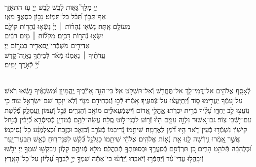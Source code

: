 \documentclass[twoside, openany, parskip=half, 11pt]{book}
\begin{document}
\\
\vspace{-1.5\baselineskip}
\begin{narrow}
יְיָ֣ מָלָךְ֮ גֵּא֢וּת לָ֫בֵ֥שׁ\hfill
לָבֵ֣שׁ יְיָ֭ עֹ֣ז הִתְאַזָּ֑ר\\ אַף־תִּכּ֥וֹן תֵּ֝בֵ֗ל בַּל־תִּמּֽוֹט׃ \hfill
נָכ֣וֹן כִּסְאֲךָ֣ מֵאָ֑ז\\ מֵעוֹלָ֣ם אָֽתָּה׃ \hfill
נָשְֿׂא֤וּ נְֿהָר֨וֹת ׀ יְיָ֗ נָשְֿׂא֣וּ נְֿהָר֣וֹת קוֹלָ֑ם\\ יִשְׂא֖וּ נְֿהָר֣וֹת דׇּכְיָֽם׃ \hfill
מִקֹּל֨וֹת ׀ מַ֤יִם רַבִּ֗ים\\ אַדִּירִ֣ים מִשְׁבְּֿֿרֵי־יָ֑ם\hfill אַדִּ֖יר בַּמָּר֣וֹם יְיָ׃ \\
עֵֽדֹתֶ֨יךָ ׀ נֶאֶמְנ֬וּ מְֿאֹ֗ד \hfill לְֿבֵיתְֿךָ֥ נַאֲוָה־קֹ֑דֶשׁ\\ יְ֝יָ֗ לְֿאֹ֣רֶךְ יָמִֽים׃ \hfill \break
\end{narrow}




\label{kaddish_yasom_shacharis}


\mournerskaddish


\\
%
לְֿאָסָֽף׃ אֱלֹהִ֥ים אַל־דֳּמִי־לָ֑ךְ אַל־תֶּחֱרַ֖שׁ וְֿאַל־תִּשְׁקֹ֣ט אֵֽל׃ כִּי־הִנֵּ֣ה אֽ֭וֹיְֿבֶיךָ יֶֽהֱמָיוּ֑ן וּ֝מְשַׂנְאֶ֗יךָ נָ֣שְֿׂאוּ רֹֽאשׁ׃ עַל־עַ֭מְּֿךָ יַֽעֲרִ֣ימוּ ס֑וֹד וְֿ֝יִֽתְיָֽעֲצ֗וּ עַל־צְֿפוּנֶֽיךָ׃
אָֽמְֿר֗וּ לְֿכ֣וּ וְֿנַכְחִידֵ֣ם מִגּ֑וֹי וְֿלֹֽא־יִזָּכֵ֖ר שֵׁם־יִשְׂרָאֵ֣ל עֽוֹד׃ כִּ֤י נֽוֹעֲצ֣וּ לֵ֣ב יַחְדָּ֑ו עָ֝לֶ֗יךָ בְּֿרִ֣ית יִכְרֹֽתוּ׃ אׇׇׇׇׇׇׇׇׇׇׇׇָֽהֳלֵ֣י אֱ֭דוֹם וְֿיִשְׁמְֿעֵאלִ֑֗ים מוֹאָ֥ב וְֿהַגְרִֽים׃ גְּֿבָ֣ל וְֿ֭עַמּוֹן וַֽעֲמָלֵ֑ק פְּֿ֝לֶ֗שֶׁת עִם־י֥שְֿׁבֵי צֽוֹר׃ גַּם־אַ֭שּׁוּר נִלְוָ֣ה עִמָּ֑ם הָי֙וּ זְֿר֖וֹעַ לִבְנֵי־ל֣וֹט סֶֽלָה׃ עֲשֵׂה־לָהֶ֥ם כְּֿמִדְיָ֑ן כְּֿסִֽיסְֿרָ֥א כְֿ֝יָבִ֗ין בְּֿנַ֣חַל קִישֽׁוֹן׃ נִשְׁמְֿד֥וּ בְֿעֵין־דֹּ֑אר הָ֥יוּ דֹּ֝֗מֶן לַֽאֲדָמָֽה׃ שִׁיתֵ֣מוֹ נְֿ֭דִיבֵמוֹ כְּֿעֹרֵ֣ב וְֿכִזְאֵ֑ב וּכְזֶ֥בַח וּ֝כְצַלְמֻנָּ֗ע כׇּל־נְֿסִיכֵֽמוֹ׃ אֲשֶׁ֣ר אָֽ֭מְֿרוּ נִ֣ירְֿשָׁה לָּ֑נוּ אֵ֖ת נְֿא֣וֹת אֱלֹהִֽים׃ אֱלֹהַ֗י שִׁיתֵ֥מוֹ כַגַּלְגַּ֑ל כְּֿ֝קַ֗שׁ לִפְנֵי־רֽוּחַ׃ כְּֿאֵ֥שׁ תִּבְעַר־יָ֑עַר וּ֝כְלֶֽהָבָ֗ה תְּֿלַהֵ֥ט הָרִֽים׃ כֵּ֭ן תִּרְדְּֿפֵ֣ם בְּֿסַֽעֲרֶ֑ךָ וּבְסוּפָֽתְךָ֥ תְֿבַֽהֲלֵֽם׃ מַלֵּ֣א פְֿנֵיהֶ֣ם קָל֑וֹן וִֽיבַקְשׁ֖וּ שִׁמְךָ֣ יְיָ׃ יֵבֹ֖שׁוּ וְֿיִבָּֽהֲל֥וּ עֲדֵי־עַ֗ד וְֿיַחְפְּֿר֥וּ וְֿיֹאבֵֽדוּ׃ וְֿיֵֽדְֿע֗וּ כִּי־אַתָּ֬ה שִׁמְךָ֣ יְיָ֣ לְֿבַדֶּ֑ךָ עֶ֝לְי֗וֹן עַל־כׇּל־הָאָֽרֶץ׃

\nextpage
\end{document}
